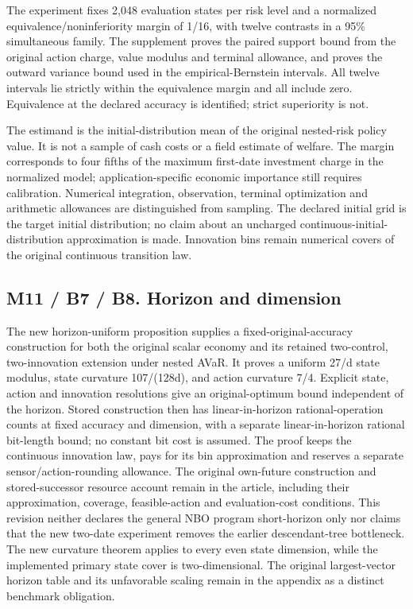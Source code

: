 The experiment fixes 2,048 evaluation states per risk level and a
normalized equivalence/noninferiority margin of 1/16, with twelve
contrasts in a 95\% simultaneous family. The supplement proves the
paired support bound from the original action charge, value modulus and
terminal allowance, and proves the outward variance bound used in the
empirical-Bernstein intervals. All twelve intervals lie strictly within
the equivalence margin and all include zero. Equivalence at the declared
accuracy is identified; strict superiority is not.

The estimand is the initial-distribution mean of the original
nested-risk policy value. It is not a sample of cash costs or a field
estimate of welfare. The margin corresponds to four fifths of the
maximum first-date investment charge in the normalized model;
application-specific economic importance still requires calibration.
Numerical integration, observation, terminal optimization and arithmetic
allowances are distinguished from sampling. The declared initial grid is
the target initial distribution; no claim about an uncharged
continuous-initial-distribution approximation is made. Innovation bins
remain numerical covers of the original continuous transition law.

\hypertarget{m11-b7-b8.-horizon-and-dimension}{%
\subsection{M11 / B7 / B8. Horizon and
dimension}\label{m11-b7-b8.-horizon-and-dimension}}

The new horizon-uniform proposition supplies a fixed-original-accuracy
construction for both the original scalar economy and its retained
two-control, two-innovation extension under nested AVaR. It proves a
uniform 27/d state modulus, state curvature 107/(128d), and action
curvature 7/4. Explicit state, action and innovation resolutions give an
original-optimum bound independent of the horizon. Stored construction
then has linear-in-horizon rational-operation counts at fixed accuracy
and dimension, with a separate linear-in-horizon rational bit-length
bound; no constant bit cost is assumed. The proof keeps the continuous
innovation law, pays for its bin approximation and reserves a separate
sensor/action-rounding allowance. The original own-future construction
and stored-successor resource account remain in the article, including
their approximation, coverage, feasible-action and evaluation-cost
conditions. This revision neither declares the general NBO program
short-horizon only nor claims that the new two-date experiment removes
the earlier descendant-tree bottleneck. The new curvature theorem
applies to every even state dimension, while the implemented primary
state cover is two-dimensional. The original largest-vector horizon
table and its unfavorable scaling remain in the appendix as a distinct
benchmark obligation.

